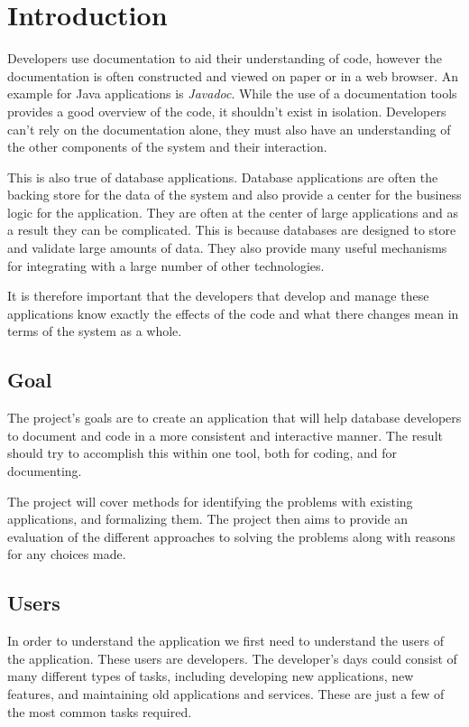 \chapter{Introduction}\label{introduction}

Developers use documentation to aid their understanding of code, however the
documentation is often constructed and viewed on paper or in a web browser. An
example for Java applications is \textit{Javadoc}\cite{javadoc}. While the use
of a documentation tools provides a good overview of the code, it shouldn't
exist in isolation.  Developers can't rely on the documentation alone, they must
also have an understanding of the other components of the system and their
interaction.

This is also true of database applications. Database applications are often the
backing store for the data of the system and also provide a center for the
business logic for the application. They are often at the center of large
applications and as a result they can be complicated. This is because databases
are designed to store and validate large amounts of data. They also provide many
useful mechanisms for integrating with a large number of other technologies.

It is therefore important that the developers that develop and manage
these applications know exactly the effects of the code and what there
changes mean in terms of the system as a whole.

\section{Goal}\label{project-goal}

The project's goals are to create an application that will help database
developers to document and code in a more consistent and interactive
manner. The result should try to accomplish this within one tool, both for coding, and for documenting.

The project will cover methods for identifying the problems with existing
applications, and formalizing them. The project then aims to provide an
evaluation of the different approaches to solving the problems along with
reasons for any choices made.

\section{Users}\label{users}

In order to understand the application we first need to understand the
users of the application. These users are developers. The developer's
days could consist of many different types of tasks, including developing new
applications, new features, and maintaining old applications and
services. These are just a few of the most common tasks required.

